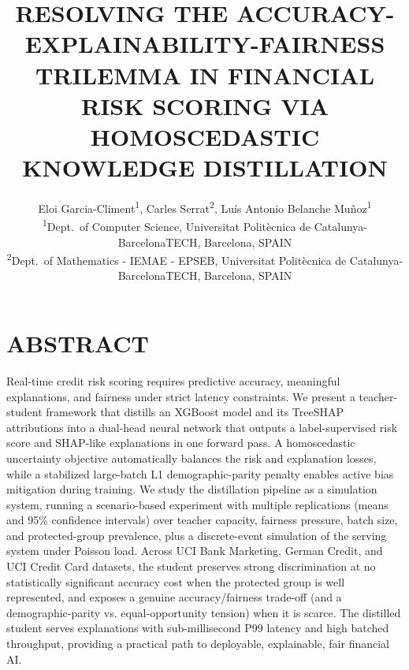 \documentclass{wscpaperproc}
\theoremstyle{wsc}
\begin{document}
%
%

\title{RESOLVING THE ACCURACY-EXPLAINABILITY-FAIRNESS TRILEMMA IN FINANCIAL RISK SCORING VIA HOMOSCEDASTIC KNOWLEDGE DISTILLATION}

\author{\begin{center}Eloi Garcia-Climent\textsuperscript{1}, Carles Serrat\textsuperscript{2}, Luís Antonio Belanche Muñoz\textsuperscript{1}\\
[11pt]
\textsuperscript{1}Dept.~of Computer Science, Universitat Politècnica de Catalunya-BarcelonaTECH, Barcelona, SPAIN\\
\textsuperscript{2}Dept.~of Mathematics - IEMAE - EPSEB, Universitat Politècnica de Catalunya-BarcelonaTECH, Barcelona, SPAIN\\
\end{center}
}

\maketitle

\vspace{-12pt}

\section*{ABSTRACT}
Real-time credit risk scoring requires predictive accuracy, meaningful explanations, and fairness under strict latency constraints. We present a teacher-student framework that distills an XGBoost model and its TreeSHAP attributions into a dual-head neural network that outputs a label-supervised risk score and SHAP-like explanations in one forward pass. A homoscedastic uncertainty objective automatically balances the risk and explanation losses, while a stabilized large-batch L1 demographic-parity penalty enables active bias mitigation during training. We study the distillation pipeline as a simulation system, running a scenario-based experiment with multiple replications (means and 95\% confidence intervals) over teacher capacity, fairness pressure, batch size, and protected-group prevalence, plus a discrete-event simulation of the serving system under Poisson load. Across UCI Bank Marketing, German Credit, and UCI Credit Card datasets, the student preserves strong discrimination at no statistically significant accuracy cost when the protected group is well represented, and exposes a genuine accuracy/fairness trade-off (and a demographic-parity vs. equal-opportunity tension) when it is scarce. The distilled student serves explanations with sub-millisecond P99 latency and high batched throughput, providing a practical path to deployable, explainable, fair financial AI.
\end{document}
